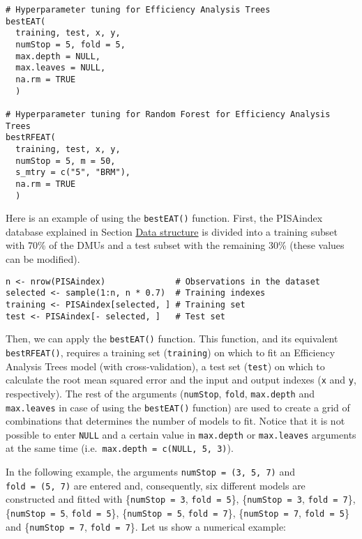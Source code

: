 \begin{verbatim}
# Hyperparameter tuning for Efficiency Analysis Trees
bestEAT(
  training, test, x, y,
  numStop = 5, fold = 5,
  max.depth = NULL,
  max.leaves = NULL,
  na.rm = TRUE
  )

# Hyperparameter tuning for Random Forest for Efficiency Analysis Trees
bestRFEAT(
  training, test, x, y,
  numStop = 5, m = 50,
  s_mtry = c("5", "BRM"), 
  na.rm = TRUE
  )
\end{verbatim}

Here is an example of using the \texttt{bestEAT()} function. First, the PISAindex database explained in Section \protect\hyperlink{section3}{Data structure} is divided into a training subset with 70\% of the DMUs and a test subset with the remaining 30\% (these values can be modified).

\begin{verbatim}
n <- nrow(PISAindex)              # Observations in the dataset
selected <- sample(1:n, n * 0.7)  # Training indexes
training <- PISAindex[selected, ] # Training set
test <- PISAindex[- selected, ]   # Test set
\end{verbatim}

Then, we can apply the \texttt{bestEAT()} function. This function, and its equivalent \texttt{bestRFEAT()}, requires a training set (\texttt{training}) on which to fit an Efficiency Analysis Trees model (with cross-validation), a test set (\texttt{test}) on which to calculate the root mean squared error and the input and output indexes (\texttt{x} and \texttt{y}, respectively). The rest of the arguments (\texttt{numStop}, \texttt{fold}, \texttt{max.depth} and \texttt{max.leaves} in case of using the \texttt{bestEAT()} function) are used to create a grid of combinations that determines the number of models to fit. Notice that it is not possible to enter \texttt{NULL} and a certain value in \texttt{max.depth} or \texttt{max.leaves} arguments at the same time (i.e.~\texttt{max.depth\ =\ c(NULL,\ 5,\ 3)}).

In the following example, the arguments \texttt{numStop\ =\ (3,\ 5,\ 7)} and \texttt{fold\ =\ (5,\ 7)} are entered and, consequently, six different models are constructed and fitted with \{\texttt{numStop\ =\ 3}, \texttt{fold\ =\ 5}\}, \{\texttt{numStop\ =\ 3}, \texttt{fold\ =\ 7}\}, \{\texttt{numStop\ =\ 5}, \texttt{fold\ =\ 5}\}, \{\texttt{numStop\ =\ 5}, \texttt{fold\ =\ 7}\}, \{\texttt{numStop\ =\ 7}, \texttt{fold\ =\ 5}\} and \{\texttt{numStop\ =\ 7}, \texttt{fold\ =\ 7}\}. Let us show a numerical example:

